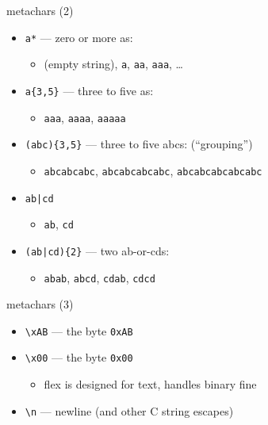 \begin{frame}[fragile,label=meta2]{metachars (2)}
    \begin{itemize}
    \item \verb|a*| --- zero or more as:
        \begin{itemize}
        \item (empty string), {\tt a}, {\tt aa}, {\tt aaa}, \ldots
        \end{itemize}
    \item \verb|a{3,5}| --- three to five as:
        \begin{itemize}
        \item {\tt aaa}, {\tt aaaa}, {\tt aaaaa}
        \end{itemize}
    \item \verb!(abc){3,5}! --- three to five abcs: (``grouping'')
        \begin{itemize}
        \item {\tt abcabcabc}, {\tt abcabcabcabc}, {\tt abcabcabcabcabc}
        \end{itemize}
    \item {\tt ab|cd}
        \begin{itemize}
        \item {\tt ab}, {\tt cd}
        \end{itemize}
    \item \verb!(ab|cd){2}! --- two ab-or-cds:
        \begin{itemize} 
        \item {\tt abab}, {\tt abcd}, {\tt cdab}, {\tt cdcd}
        \end{itemize}
    \end{itemize}
\end{frame}

\begin{frame}[fragile,label=meta3]{metachars (3)}
    \begin{itemize}
    \item \verb|\xAB| --- the byte {\tt 0xAB}
    \item \verb|\x00| --- the byte {\tt 0x00}
        \begin{itemize}
        \item flex is designed for text, handles binary fine
        \end{itemize}
    \item \verb|\n| --- newline (and other C string escapes)
    \end{itemize}
\end{frame}

